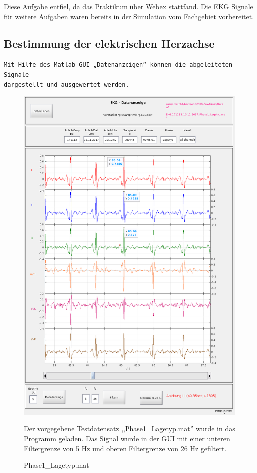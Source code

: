 \documentclass[a4paper,12pt,titlepage]{scrartcl}
\begin{document}
Diese Aufgabe entfiel, da das Praktikum über Webex stattfand. Die EKG Signale für weitere Aufgaben waren bereits in der Simulation vom Fachgebiet vorbereitet.

\newpage
\subsection{Bestimmung der elektrischen Herzachse}
\texttt{Mit Hilfe des Matlab-GUI „Datenanzeigen“ können die abgeleiteten Signale \\dargestellt und ausgewertet werden.}

\begin{figure}[ht]
    \begin{minipage}[t]{0.5\linewidth}
        \centering
        \includegraphics[width=0.9\linewidth, valign=t]{Assets/LaborBMT-15-11-03.png}
        \caption{Phase1\_Lagetyp.mat}
        \label{lagetyp}
    \end{minipage}%
    \begin{minipage}[t]{0.5\linewidth}
        Der vorgegebene Testdatensatz ,,Phase1\_Lagetyp.mat'' wurde in das Programm geladen. Das Signal wurde in der GUI mit einer unteren Filtergrenze von 5 Hz und oberen Filtergrenze von 26 Hz gefiltert.


\end{minipage}
\end{figure}
\end{document}
